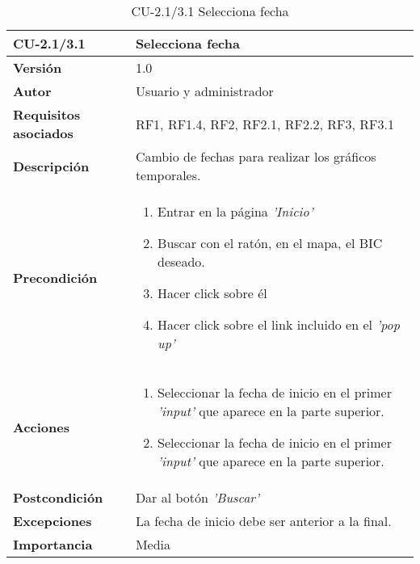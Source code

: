 \begin{table}[h!]
	\centering
	\begin{tabularx}{\linewidth}{ p{} p{} }
		\toprule
		\textbf{CU-2.1/3.1}    & \textbf{Selecciona fecha}\\
		\toprule
		\textbf{Versión}              & 1.0    \\
		\textbf{Autor}                & Usuario y administrador \\
		\textbf{Requisitos asociados} & RF1, RF1.4, RF2, RF2.1, RF2.2, RF3, RF3.1\\
		\textbf{Descripción}          & Cambio de fechas para realizar los gráficos temporales.  \\
        \textbf{Precondición}         & 
        \begin{enumerate}
			\def\labelenumi{\arabic{enumi}.}
			\tightlist
			\item Entrar en la página \textit{'Inicio'}
			\item Buscar con el ratón, en el mapa, el BIC deseado.
            \item Hacer click sobre él
            \item Hacer click sobre el link incluido en el \textit{'pop up'} 
            
		\end{enumerate}\\
		
		\textbf{Acciones}             &
		\begin{enumerate}
			\def\labelenumi{\arabic{enumi}.}
			\tightlist
			\item Seleccionar la fecha de inicio en el primer \textit{'input'} que aparece en la parte superior.
                \item Seleccionar la fecha de inicio en el primer \textit{'input'} que aparece en la parte superior.

		\end{enumerate}\\
		\textbf{Postcondición}        &  Dar al botón \textit{'Buscar'} \\
		\textbf{Excepciones}          &  La fecha de inicio debe ser anterior a la final.\\
		\textbf{Importancia}          & Media \\
		\bottomrule
	\end{tabularx}
	\caption{CU-2.1/3.1 Selecciona fecha}
\end{table}
